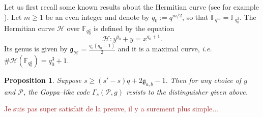\documentclass[a4paper]{article}
\newtheorem{proposition}[thm]{Proposition}
\theoremstyle{definition}
\theoremstyle{remark}
\newcommand{\calP}{\mathcal{P}}
\newcommand{\calH}{\mathcal{H}}
\newcommand{\fqm}{\mathbb{F}_{q^m}}
\newcommand{\fqo}{\mathbb{F}_{q_0^2}}
\newcommand\mathieu[1]{\textcolor{brown}{#1}}
\begin{document}
\noindent Let us first recall some known results about the Hermitian curve (see for example \cite{Sti09}). Let $m \geq 1$  be an even integer and denote by $q_0 := q^{m/2}$, so that $\fqm = \fqo$. The Hermitian curve $\calH$ over $\fqo$ is defined by the equation
$$\calH : y^{q_0}+y = x^{q_0+1}.$$
Its genus is given by $\mathfrak{g}_{\calH} = \frac{q_0(q_0-1)}{2}$ and it is a maximal curve, \emph{i.e.} $\#\calH(\fqo) = q_0^3+1$.


\begin{proposition} \label{prop:Hermitian_Goppa_like_are_secured}
    Suppose $s \geq (s'-s)q+2\mathfrak{g}_{a,b}-1$. Then for any choice of $g$ and $\calP$, the Goppa--like code $\Gamma_s(\calP,g)$ resists to the distinguisher given above.
\end{proposition}

\mathieu{Je suis pas super satisfait de la preuve, il y a surement plus simple...}
\end{document}
